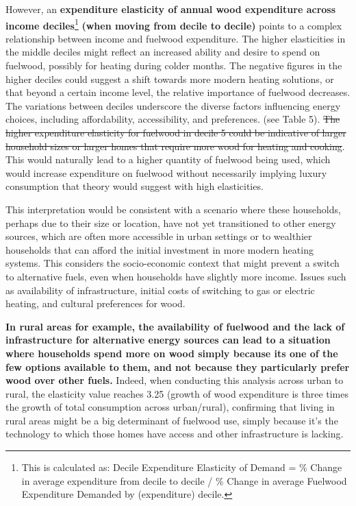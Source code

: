 \documentclass[
  letterpaper,
  DIV=11,
  numbers=noendperiod]{scrartcl}
\begin{document}
However, an \textbf{expenditure elasticity of annual wood expenditure
across income deciles}\footnote{This is calculated as: Decile
  Expenditure Elasticity of Demand = \% Change in average expenditure
  from decile to decile / \% Change in average Fuelwood Expenditure
  Demanded by (expenditure) decile.

  \hspace{0pt}} \textbf{(when moving from decile to decile)} points to a
complex relationship between income and fuelwood expenditure. The higher
elasticities in the middle deciles might reflect an increased ability
and desire to spend on fuelwood, possibly for heating during colder
months. The negative figures in the higher deciles could suggest a shift
towards more modern heating solutions, or that beyond a certain income
level, the relative importance of fuelwood decreases. The variations
between deciles underscore the diverse factors influencing energy
choices, including affordability, accessibility, and preferences. (see
Table 5). \st{The higher expenditure elasticity for fuelwood in decile 5
could be indicative of larger household sizes or larger homes that
require more wood for heating and cooking}. This would naturally lead to
a higher quantity of fuelwood being used, which would increase
expenditure on fuelwood without necessarily implying luxury consumption
that theory would suggest with high elasticities.

This interpretation would be consistent with a scenario where these
households, perhaps due to their size or location, have not yet
transitioned to other energy sources, which are often more accessible in
urban settings or to wealthier households that can afford the initial
investment in more modern heating systems. This considers the
socio-economic context that might prevent a switch to alternative fuels,
even when households have slightly more income. Issues such as
availability of infrastructure, initial costs of switching to gas or
electric heating, and cultural preferences for wood.

\textbf{In rural areas for example, the availability of fuelwood and the
lack of infrastructure for alternative energy sources can lead to a
situation where households spend more on wood simply because
it\textquotesingle s one of the few options available to them, and not
because they particularly prefer wood over other fuels.} Indeed, when
conducting this analysis across urban to rural, the elasticity value
reaches 3.25 (growth of wood expenditure is three times the growth of
total consumption across urban/rural), confirming that living in rural
areas might be a big determinant of fuelwood use, simply because it's
the technology to which those homes have access and other infrastructure
is lacking.
\end{document}
